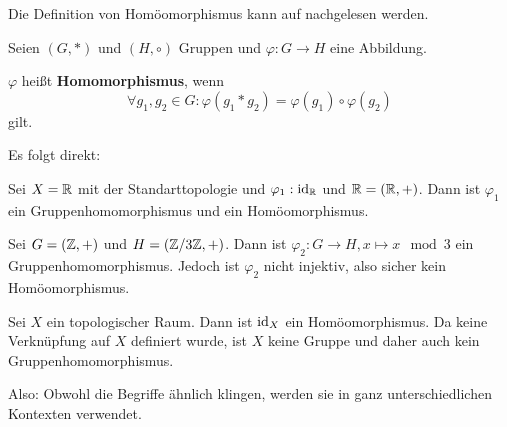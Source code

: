 \begin{solution}[\ref{ub3:meinsExtra}]
    Die Definition von Homöomorphismus kann auf 
    nachgelesen werden.

    \begin{definition}
        Seien $(G, *)$ und $(H, \circ)$ Gruppen und 
        $\varphi:G \rightarrow H$ eine Abbildung.

        $\varphi$ heißt \textbf{Homomorphismus}, wenn
        \[\forall g_1, g_2 \in G: \varphi(g_1 * g_2) = \varphi(g_1) \circ \varphi(g_2)\]
        gilt.
    \end{definition}

    Es folgt direkt:
    \begin{bspenum}
        \item Sei $X = \mathbb{R}$ mit der Standarttopologie und $\varphi_1: \textnormal{id}_{\mathbb{R}}$ und $\mathbb{R} = (\mathbb{R},+)$. Dann ist $\varphi_1$ ein Gruppenhomomorphismus und ein Homöomorphismus.
        \item Sei $G = (\mathbb{Z}, +)$ und $H = (\mathbb{Z} / 3 \mathbb{Z}, +)$. Dann ist $\varphi_2 : G \rightarrow H, x \mapsto x \mod 3$ ein Gruppenhomomorphismus.
              Jedoch ist $\varphi_2$ nicht injektiv, also sicher kein Homöomorphismus.
        \item Sei $X$ ein topologischer Raum. Dann ist $\textnormal{id}_X$ ein Homöomorphismus. Da keine Verknüpfung auf $X$ definiert wurde, ist $X$ keine Gruppe und daher auch kein Gruppenhomomorphismus.
    \end{bspenum}

    Also: Obwohl die Begriffe ähnlich klingen, werden sie in ganz unterschiedlichen
    Kontexten verwendet.
\end{solution}

